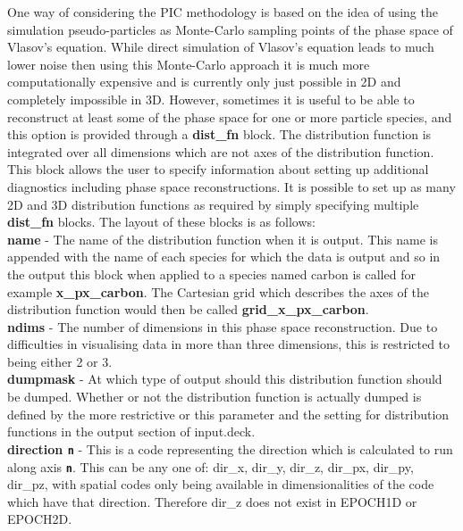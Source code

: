 \documentclass[12pt,a4paper]{article}
\newcommand{\emphtext}{\color{warwickdark} \fontfamily{phv}\selectfont\Large\bf}
\newcommand{\inlinecode}[1]{{\color{warwickred} \bf\texttt{#1}}}
\newcommand{\inlineemph}[1]{{\color{warwicklight} \bf{#1}}}
\begin{document}
One way of considering the PIC methodology is based on the idea of using the
simulation pseudo-particles as Monte-Carlo sampling points of the phase space
of Vlasov's equation. While direct simulation of Vlasov's equation leads to
much lower noise then using this Monte-Carlo approach it is much more
computationally expensive and is currently only just possible in 2D and
completely impossible in 3D. However, sometimes it is useful to be able to
reconstruct at least some of the phase space for one or more particle species,
and this option is provided through a \inlineemph{dist\_fn} block. The
distribution function is integrated over all dimensions which are not axes of
the distribution function.\\

This block allows the user to specify information about
setting up additional diagnostics including phase space reconstructions. It is
possible to set up as many 2D and 3D distribution functions as required by
simply specifying multiple \inlineemph{dist\_fn} blocks. The layout of these
blocks is as follows:\\

{\emphtext name} - The name of the distribution function when it is
output. This name is appended with the name of each species for which the data
is output and so in the output this block when applied to a species named
carbon is called for example \inlineemph{x\_px\_carbon}. The Cartesian grid
which describes the axes of the distribution function would then be called
\inlineemph{grid\_x\_px\_carbon}.\\

{\emphtext ndims} - The number of dimensions in this phase space
reconstruction. Due to difficulties in visualising data in more than three
dimensions, this is restricted to being either 2 or 3.\\

{\emphtext dumpmask} - At which type of output should this distribution
function should be dumped. Whether or not the distribution function is actually
dumped is defined by the more restrictive or this parameter and the setting for
distribution functions in the output section of input.deck.\\

{\emphtext direction\inlinecode{n}} - This is a code representing the direction
which is calculated to run along axis \inlinecode{n}. This can be any one of:
dir\_x, dir\_y, dir\_z, dir\_px, dir\_py, dir\_pz, with spatial codes only
being available in dimensionalities of the code which have that
direction. Therefore dir\_z does not exist in EPOCH1D or EPOCH2D.\\
\end{document}
